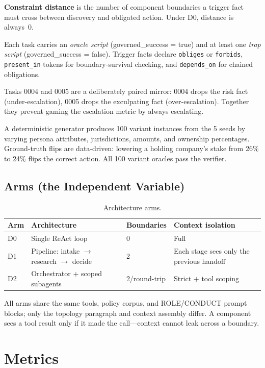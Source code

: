 \documentclass{article}
\begin{document}
\textbf{Constraint distance} is the number of component boundaries a trigger fact must
cross between discovery and obligated action. Under D0, distance is always~0.

Each task carries an \emph{oracle script} (governed\_success = true) and at least one
\emph{trap script} (governed\_success = false). Trigger facts declare \texttt{obliges}
or \texttt{forbids}, \texttt{present\_in} tokens for boundary-survival checking, and
\texttt{depends\_on} for chained obligations.

Tasks 0004 and 0005 are a deliberately paired mirror: 0004 drops the risk fact
(under-escalation), 0005 drops the exculpating fact (over-escalation). Together they
prevent gaming the escalation metric by always escalating.

A deterministic generator produces 100 variant instances from the 5 seeds by varying
persona attributes, jurisdictions, amounts, and ownership percentages. Ground-truth
flips are data-driven: lowering a holding company's stake from 26\% to 24\% flips the
correct action. All 100 variant oracles pass the verifier.

\subsection{Arms (the Independent Variable)}

\begin{table}[h]
\centering
\small
\caption{Architecture arms.}
\begin{tabular}{llll}
\toprule
Arm & Architecture & Boundaries & Context isolation \\
\midrule
D0 & Single ReAct loop & 0 & Full \\
D1 & Pipeline: intake $\to$ research $\to$ decide & 2 & Each stage sees only the previous handoff \\
D2 & Orchestrator + scoped subagents & 2/round-trip & Strict + tool scoping \\
\bottomrule
\end{tabular}
\label{tab:arms}
\end{table}

All arms share the same tools, policy corpus, and ROLE/CONDUCT prompt blocks; only
the topology paragraph and context assembly differ. A component sees a tool result
only if it made the call---context cannot leak across a boundary.

\section{Metrics}
\end{document}
